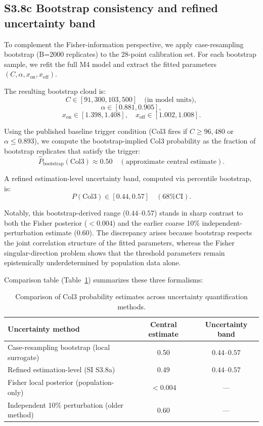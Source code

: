 \documentclass[11pt]{article}
\begin{document}
\subsection*{S3.8c Bootstrap consistency and refined uncertainty band}

To complement the Fisher-information perspective, we apply case-resampling bootstrap (B=2000 replicates) to the 28-point calibration set.
For each bootstrap sample, we refit the full M4 model and extract the fitted parameters $(C,\alpha,x_{\mathrm{on}},x_{\mathrm{off}})$.

The resulting bootstrap cloud is:
\[
C \in [91{,}300, 103{,}500] \quad \text{(in model units)},
\]
\[
\alpha \in [0.881, 0.905],
\]
\[
x_{\mathrm{on}} \in [1.398, 1.408],
\quad x_{\mathrm{off}} \in [1.002, 1.008].
\]

Using the published baseline trigger condition (Col3 fires if $C \ge 96{,}480$ or $\alpha \le 0.893$), we compute the bootstrap-implied Col3 probability as the fraction of bootstrap replicates that satisfy the trigger:
\[
\hat{P}_{\text{bootstrap}}(\text{Col3}) \approx 0.50 \quad (\text{approximate central estimate}).
\]

A refined estimation-level uncertainty band, computed via percentile bootstrap, is:
\[
P(\text{Col3}) \in [0.44, 0.57] \quad (\text{68\% CI}).
\]

Notably, this bootstrap-derived range ($0.44$--$0.57$) stands in sharp contrast to both the Fisher posterior ($<0.004$) and the earlier coarse 10\% independent-perturbation estimate ($0.60$). The discrepancy arises because bootstrap respects the joint correlation structure of the fitted parameters, whereas the Fisher singular-direction problem shows that the threshold parameters remain epistemically underdetermined by population data alone.

Comparison table (Table~\ref{tab:S3_col3_comparison}) summarizes these three formalisms:

\begin{table}[H]
\centering
\caption{Comparison of Col3 probability estimates across uncertainty quantification methods.}
\label{tab:S3_col3_comparison}
\begin{tabular}{lcc}
\toprule
Uncertainty method & Central estimate & Uncertainty band \\
\midrule
Case-resampling bootstrap (local surrogate) & 0.50 & $0.44$--$0.57$ \\
Refined estimation-level (SI S3.8a) & 0.49 & $0.44$--$0.57$ \\
Fisher local posterior (population-only) & $<0.004$ & — \\
Independent 10\% perturbation (older method) & 0.60 & — \\
\bottomrule
\end{tabular}
\end{table}
\end{document}
